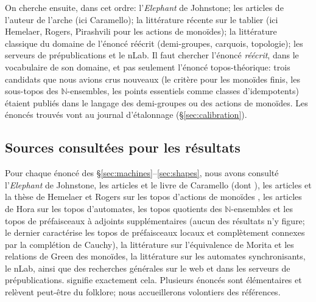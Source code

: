 On cherche ensuite, dans cet ordre: l'\emph{Elephant} de Johnstone; les articles de l'auteur de l'arche (ici Caramello); la littérature récente sur le tablier (ici Hemelaer, Rogers, Pirashvili pour les actions de monoïdes); la littérature classique du domaine de l'énoncé réécrit (demi-groupes, carquois, topologie); les serveurs de prépublications et le nLab. Il faut chercher l'énoncé \emph{réécrit}, dans le vocabulaire de son domaine, et pas seulement l'énoncé topos-théorique: trois candidats que nous avions crus nouveaux (le critère pour les monoïdes finis, les sous-topos des $\mathbb N$-ensembles, les points essentiels comme classes d'idempotents) étaient publiés dans le langage des demi-groupes ou des actions de monoïdes. Les énoncés trouvés vont au journal d'étalonnage (\S\ref{sec:calibration}).

\subsection{Sources consultées pour les résultats}

Pour chaque énoncé des \S\ref{sec:machines}--\ref{sec:shapes}, nous avons consulté l'\emph{Elephant} de Johnstone, les articles et le livre de Caramello (dont \cite{caramello-chamoun}), les articles et la thèse de Hemelaer et Rogers sur les topos d'actions de monoïdes \cite{hemelaer-rogers,rogers-1905,rogers-thesis}, les articles de Hora sur les topos d'automates, les topos quotients des $\mathbb N$-ensembles et les topos de préfaisceaux à adjoints supplémentaires \cite{hora-automata,hora-kamio,hora-adjoints} (aucun des résultats n'y figure; le dernier caractérise les topos de préfaisceaux locaux et complètement connexes par la complétion de Cauchy), la littérature sur l'équivalence de Morita et les relations de Green des monoïdes, la littérature sur les automates synchronisants, le nLab, ainsi que des recherches générales sur le web et dans les serveurs de prépublications.  signifie exactement cela. Plusieurs énoncés sont élémentaires et relèvent peut-être du folklore; nous accueillerons volontiers des références.

